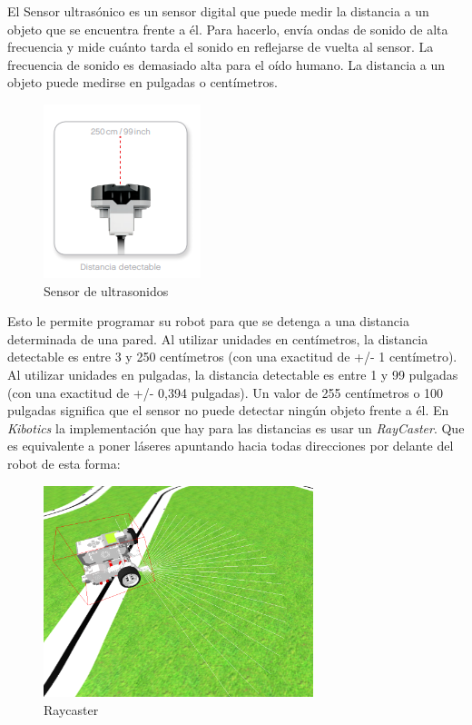 El Sensor ultrasónico es un sensor digital que puede medir la distancia a un objeto que se encuentra frente a él. Para hacerlo, envía ondas de sonido de alta frecuencia y mide cuánto tarda el sonido en reflejarse de vuelta al sensor. La frecuencia de sonido es demasiado alta para el oído humano.
La distancia a un objeto puede medirse en pulgadas o centímetros.\newline
\begin{figure}
    \centering
    \includegraphics[width=0.5\linewidth]{img/ultrasonidos.png}
    \caption{Sensor de ultrasonidos}
    \label{fig:ultrasonido}
\end{figure}
Esto le permite programar su robot para que se detenga a una distancia determinada de una pared. Al utilizar unidades en centímetros, la distancia detectable es entre 3 y 250 centímetros (con una exactitud de +/- 1 centímetro). Al utilizar unidades en pulgadas, la distancia detectable es entre 1 y 99 pulgadas (con una exactitud de +/- 0,394 pulgadas). Un valor de
255 centímetros o 100 pulgadas significa que el sensor no puede
detectar ningún objeto frente a él.\newline
En \textit{Kibotics} la implementación que hay para las distancias es  usar un \textit{RayCaster}. Que es equivalente a poner láseres apuntando hacia todas direcciones por delante del robot de esta forma:

\begin{figure}[H]
    \centering
    \includegraphics[width=0.7\textwidth]{img/pruebaUS.png}
    \caption{Raycaster} \label{fig:raycaster}
\end{figure}

